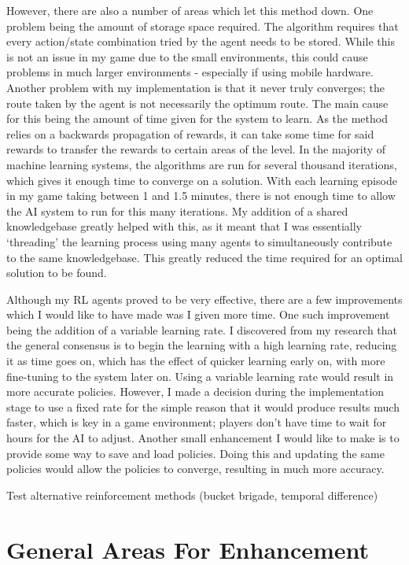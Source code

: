 \documentclass[a4paper,oneside]{report}
\begin{document}
However, there are also a number of areas which let this method down. One problem being the amount of storage space required. The algorithm requires that every action/state combination tried by the agent needs to be stored. While this is not an issue in my game due to the small environments, this could cause problems in much larger environments - especially if using mobile hardware. Another problem with my implementation is that it never truly converges; the route taken by the agent is not necessarily the optimum route. The main cause for this being the amount of time given for the system to learn. As the method relies on a backwards propagation of rewards, it can take some time for said rewards to transfer the rewards to certain areas of the level. In the majority of machine learning systems, the algorithms are run for several thousand iterations, which gives it enough time to converge on a solution. With each learning episode in my game taking between 1 and 1.5 minutes, there is not enough time to allow the AI system to run for this many iterations. My addition of a shared knowledgebase greatly helped with this, as it meant that I was essentially `threading' the learning process using many agents to simultaneously contribute to the same knowledgebase. This greatly reduced the time required for an optimal solution to be found. 

Although my RL agents proved to be very effective, there are a few improvements which I would like to have made was I given more time. One such improvement being the addition of a variable learning rate. I discovered from my research that the general consensus is to begin the learning with a high learning rate, reducing it as time goes on, which has the effect of quicker learning early on, with more fine-tuning to the system later on. Using a variable learning rate would result in more accurate policies. However, I made a decision during the implementation stage to use a fixed rate for the simple reason that it would produce results much faster, which is key in a game environment; players don't have time to wait for hours for the AI to adjust. Another small enhancement I would like to make is to provide some way to save and load policies. Doing this and updating the same policies would allow the policies to converge, resulting in much more accuracy.

Test alternative reinforcement methods (bucket brigade, temporal difference) 

\section{General Areas For Enhancement}
\end{document}
